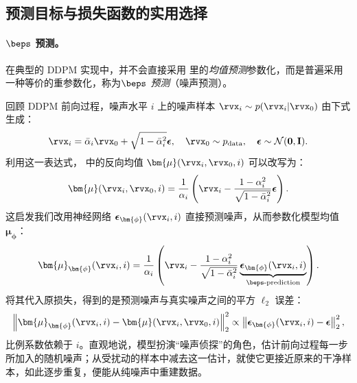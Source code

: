 \subsection{预测目标与损失函数的实用选择}\label{subsec:ddpm-prediction}

\paragraph{$\beps$ 预测。}
在典型的 DDPM 实现中，并不会直接采用  里的\emph{均值预测}参数化，而是普遍采用一种等价的重参数化，称为\emph{$\beps$ 预测}（噪声预测）。

回顾 DDPM 前向过程，噪声水平 $i$ 上的噪声样本 $\rvx_i \sim p(\rvx_i |\rvx_0)$ 由下式生成：
\begin{equation}\label{eq:ddpm-perturbation}
    \rvx_i = \bar{\alpha}_i \rvx_0 + \sqrt{1 - \bar{\alpha}_i^2}   \boldsymbol{\epsilon}, \quad \rvx_0 \sim p_{\text{data}}, \quad \boldsymbol{\epsilon} \sim \mathcal{N}(\mathbf{0}, \mathbf{I}).
\end{equation}
利用这一表达式， 中的反向均值 $\bm{\mu}(\rvx_i, \rvx_0, i)$ 可以改写为：
\[
\bm{\mu}(\rvx_i, \rvx_0, i) = \frac{1}{\alpha_i} \left( \rvx_i - \frac{1 - \alpha_i^2}{\sqrt{1 - \bar{\alpha}_i^2}} \boldsymbol{\epsilon} \right).
\]
这启发我们改用神经网络 $\boldsymbol{\epsilon}_{\bm{\phi}}(\rvx_i, i)$ 直接预测噪声，从而参数化模型均值 $\bm{\mu}_{\bm{\phi}}$：
\[
\bm{\mu}_{\bm{\phi}}(\rvx_i, i) = \frac{1}{\alpha_i} \left( \rvx_i - \frac{1 - \alpha_i^2}{\sqrt{1 - \bar{\alpha}_i^2}} \underbrace{\boldsymbol{\epsilon}_{\bm{\phi}}(\rvx_i, i)}_{\beps\text{-prediction}} \right).
\]
将其代入原损失，得到的是预测噪声与真实噪声之间的平方 $\ell_2$ 误差：
\[
\left\| \bm{\mu}_{\bm{\phi}}(\rvx_i, i) - \bm{\mu}(\rvx_i, \rvx_0, i) \right\|_2^2 \propto \left\| \boldsymbol{\epsilon}_{\bm{\phi}}(\rvx_i, i) - \boldsymbol{\epsilon} \right\|_2^2,
\]
比例系数依赖于 $i$。直观地说，模型扮演``噪声侦探''的角色，估计前向过程每一步所加入的随机噪声；从受扰动的样本中减去这一估计，就使它更接近原来的干净样本，如此逐步重复，便能从纯噪声中重建数据。

